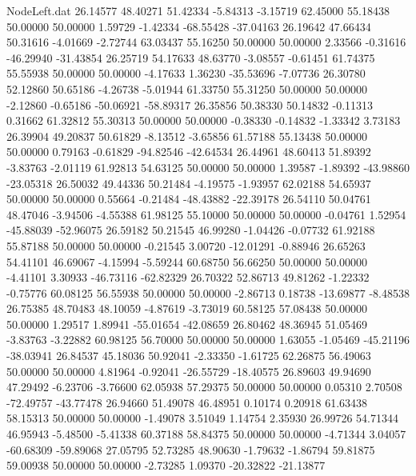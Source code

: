 \begin{filecontents}{NodeLeft.dat}
  26.14577   48.40271   51.42334    -5.84313   -3.15719   62.45000   55.18438   50.00000   50.00000    1.59729   -1.42334  -68.55428  -37.04163
  26.19642   47.66434   50.31616    -4.01669   -2.72744   63.03437   55.16250   50.00000   50.00000    2.33566   -0.31616  -46.29940  -31.43854
  26.25719   54.17633   48.63770    -3.08557   -0.61451   61.74375   55.55938   50.00000   50.00000   -4.17633    1.36230  -35.53696   -7.07736
  26.30780   52.12860   50.65186    -4.26738   -5.01944   61.33750   55.31250   50.00000   50.00000   -2.12860   -0.65186  -50.06921  -58.89317
  26.35856   50.38330   50.14832    -0.11313    0.31662   61.32812   55.30313   50.00000   50.00000   -0.38330   -0.14832   -1.33342    3.73183
  26.39904   49.20837   50.61829    -8.13512   -3.65856   61.57188   55.13438   50.00000   50.00000    0.79163   -0.61829  -94.82546  -42.64534
  26.44961   48.60413   51.89392    -3.83763   -2.01119   61.92813   54.63125   50.00000   50.00000    1.39587   -1.89392  -43.98860  -23.05318
  26.50032   49.44336   50.21484    -4.19575   -1.93957   62.02188   54.65937   50.00000   50.00000    0.55664   -0.21484  -48.43882  -22.39178
  26.54110   50.04761   48.47046    -3.94506   -4.55388   61.98125   55.10000   50.00000   50.00000   -0.04761    1.52954  -45.88039  -52.96075
  26.59182   50.21545   46.99280    -1.04426   -0.07732   61.92188   55.87188   50.00000   50.00000   -0.21545    3.00720  -12.01291   -0.88946
  26.65263   54.41101   46.69067    -4.15994   -5.59244   60.68750   56.66250   50.00000   50.00000   -4.41101    3.30933  -46.73116  -62.82329
  26.70322   52.86713   49.81262    -1.22332   -0.75776   60.08125   56.55938   50.00000   50.00000   -2.86713    0.18738  -13.69877   -8.48538
  26.75385   48.70483   48.10059    -4.87619   -3.73019   60.58125   57.08438   50.00000   50.00000    1.29517    1.89941  -55.01654  -42.08659
  26.80462   48.36945   51.05469    -3.83763   -3.22882   60.98125   56.70000   50.00000   50.00000    1.63055   -1.05469  -45.21196  -38.03941
  26.84537   45.18036   50.92041    -2.33350   -1.61725   62.26875   56.49063   50.00000   50.00000    4.81964   -0.92041  -26.55729  -18.40575
  26.89603   49.94690   47.29492    -6.23706   -3.76600   62.05938   57.29375   50.00000   50.00000    0.05310    2.70508  -72.49757  -43.77478
  26.94660   51.49078   46.48951     0.10174    0.20918   61.63438   58.15313   50.00000   50.00000   -1.49078    3.51049    1.14754    2.35930
  26.99726   54.71344   46.95943    -5.48500   -5.41338   60.37188   58.84375   50.00000   50.00000   -4.71344    3.04057  -60.68309  -59.89068
  27.05795   52.73285   48.90630    -1.79632   -1.86794   59.81875   59.00938   50.00000   50.00000   -2.73285    1.09370  -20.32822  -21.13877

\end{filecontents}
